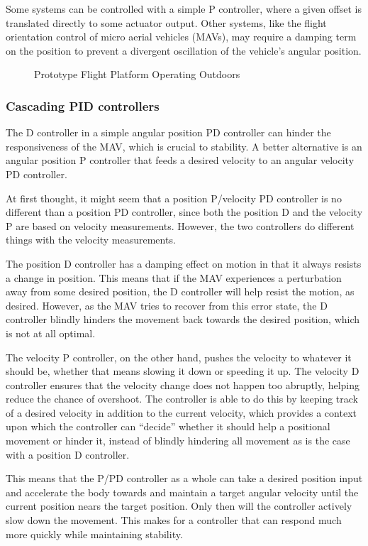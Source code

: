 \documentclass[12pt,letterpaper]{article}
\begin{document}
Some systems can be controlled with a simple P controller, where a given offset
is translated directly to some actuator output. Other systems, like the flight
orientation control of micro aerial vehicles (MAVs), may require a damping term
on the position to prevent a divergent oscillation of the vehicle's angular
position.


\begin{figure}[h!]
\caption{Prototype Flight Platform Operating Outdoors}
\end{figure}



\subsubsection*{Cascading PID controllers}

The D controller in a simple angular position PD controller can hinder the
responsiveness of the MAV, which is crucial to stability. A better alternative
is an angular position P controller that feeds a desired velocity to an angular
velocity PD controller.

At first thought, it might seem that a position P/velocity PD controller is no
different than a position PD controller, since both the position D and the
velocity P are based on velocity measurements. However, the two controllers do
different things with the velocity measurements.

The position D controller has a damping effect on motion in that it always
resists a change in position. This means that if the MAV experiences a
perturbation away from some desired position, the D controller will help resist
the motion, as desired. However, as the MAV tries to recover from this error
state, the D controller blindly hinders the movement back towards the desired
position, which is not at all optimal.

The velocity P controller, on the other hand, pushes the velocity to whatever
it should be, whether that means slowing it down or speeding it up. The
velocity D controller ensures that the velocity change does not happen too
abruptly, helping reduce the chance of overshoot. The controller is able to do
this by keeping track of a desired velocity in addition to the current
velocity, which provides a context upon which the controller can ``decide''
whether it should help a positional movement or hinder it, instead of blindly
hindering all movement as is the case with a position D controller.

This means that the P/PD controller as a whole can take a desired position
input and accelerate the body towards and maintain a target angular velocity
until the current position nears the target position. Only then will the
controller actively slow down the movement. This makes for a controller that
can respond much more quickly while maintaining stability.
\end{document}
